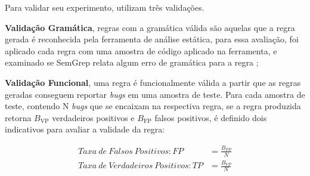 \documentclass[
    12pt,                %
    openright,           %
    oneside,             %
    a4paper,             %
    english,             %
    brazil               %
]{abntex2}
\begin{document}
\begin{itemize}
\par
Para validar seu experimento,  utilizam três validações.
\par
\textbf{Validação Gramática}, regras com a gramática válida são aquelas que a regra gerada é reconhecida pela ferramenta de análise estática, para essa avaliação, foi aplicado cada regra com uma amostra de código aplicado na ferramenta, e examinado se SemGrep relata algum erro de gramática para a regra \cite{hou2025generation};
\par 
\textbf{Validação Funcional}, uma regra é funcionalmente válida a partir que as regras geradas conseguem reportar \textit{bugs} em uma amostra de teste.
Para cada amostra de teste, contendo N \textit{bugs} que se encaixam na respectiva regra, se a regra produzida retorna $B_{\text{VP}}$ verdadeiros positivos e $B_{\text{FP}}$ falsos positivos, é definido dois indicativos para avaliar a validade da regra: \cite{hou2025generation}

\begin{align}
    Taxa\ de\ Falsos\ Positivos : FP &= \frac{B_{FP}}{N} \\
    Taxa\ de\ Verdadeiros\ Positivos : TP &= \frac{B_{VP}}{N}
\end{align}


\end{itemize}
\end{document}
